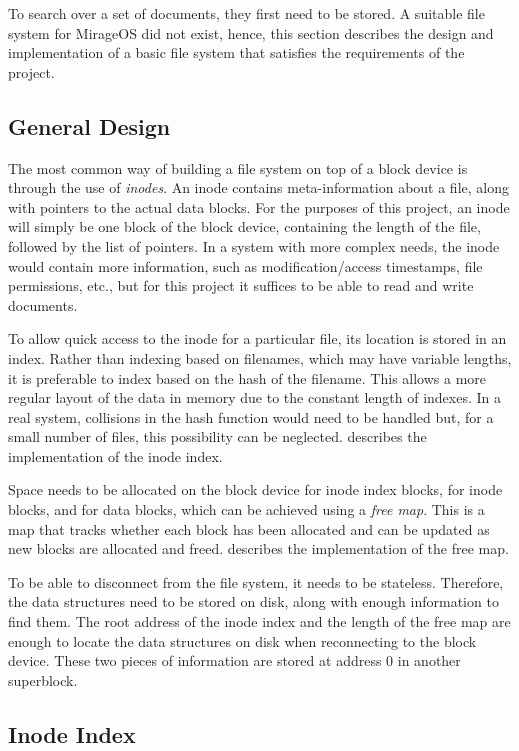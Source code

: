 \documentclass[12pt,a4paper,twoside,openright]{report}
\begin{document}
To search over a set of documents, they first need to be stored. A suitable file system for MirageOS did not exist, hence, this section describes the design and implementation of a basic file system that satisfies the requirements of the project.

\subsection{General Design}
The most common way of building a file system on top of a block device is through the use of \emph{inodes}. An inode contains meta-information about a file, along with pointers to the actual data blocks. For the purposes of this project, an inode will simply be one block of the block device, containing the length of the file, followed by the list of pointers. In a system with more complex needs, the inode would contain more information, such as modification/access timestamps, file permissions, etc., but for this project it suffices to be able to read and write documents.

To allow quick access to the inode for a particular file, its location is stored in an index. Rather than indexing based on filenames, which may have variable lengths, it is preferable to index based on the hash of the filename. This allows a more regular layout of the data in memory due to the constant length of indexes. In a real system, collisions in the hash function would need to be handled but, for a small number of files, this possibility can be neglected.  describes the implementation of the inode index.

Space needs to be allocated on the block device for inode index blocks, for inode blocks, and for data blocks, which can be achieved using a \emph{free map}. This is a map that tracks whether each block has been allocated and can be updated as new blocks are allocated and freed.  describes the implementation of the free map.

To be able to disconnect from the file system, it needs to be stateless. Therefore, the data structures need to be stored on disk, along with enough information to find them. The root address of the inode index and the length of the free map are enough to locate the data structures on disk when reconnecting to the block device. These two pieces of information are stored at address 0 in another superblock.

\subsection{Inode Index}
\label{subsec:inodeindex}
\end{document}
